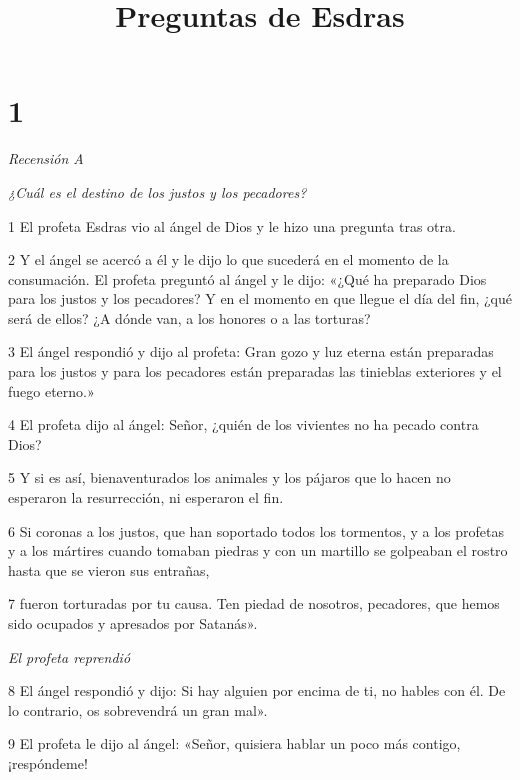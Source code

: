 

\title{Preguntas de Esdras}

\chapter{1}

\par \textit{Recensión A}

\par \textit{¿Cuál es el destino de los justos y los pecadores?}

\par 1 El profeta Esdras vio al ángel de Dios y le hizo una pregunta tras otra.

\par 2 Y el ángel se acercó a él y le dijo lo que sucederá en el momento de la consumación. El profeta preguntó al ángel y le dijo: «¿Qué ha preparado Dios para los justos y los pecadores? Y en el momento en que llegue el día del fin, ¿qué será de ellos? ¿A dónde van, a los honores o a las torturas?

\par 3 El ángel respondió y dijo al profeta: Gran gozo y luz eterna están preparadas para los justos y para los pecadores están preparadas las tinieblas exteriores y el fuego eterno.»

\par 4 El profeta dijo al ángel: Señor, ¿quién de los vivientes no ha pecado contra Dios?

\par 5 Y si es así, bienaventurados los animales y los pájaros que lo hacen no esperaron la resurrección, ni esperaron el fin.

\par 6 Si coronas a los justos, que han soportado todos los tormentos, y a los profetas y a los mártires cuando tomaban piedras y con un martillo se golpeaban el rostro hasta que se vieron sus entrañas,

\par 7 fueron torturadas por tu causa. Ten piedad de nosotros, pecadores, que hemos sido ocupados y apresados ​​por Satanás».

\par \textit{El profeta reprendió}

\par 8 El ángel respondió y dijo: Si hay alguien por encima de ti, no hables con él. De lo contrario, os sobrevendrá un gran mal».

\par 9 El profeta le dijo al ángel: «Señor, quisiera hablar un poco más contigo, ¡respóndeme!

